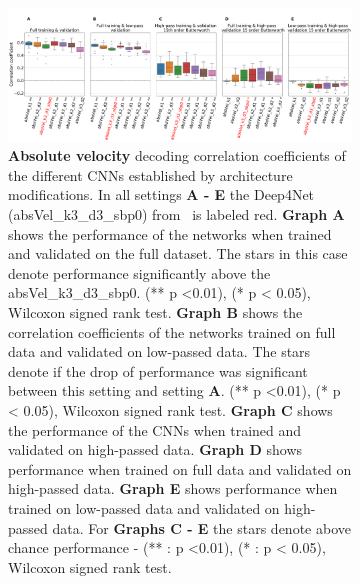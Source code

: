 \begin{itemize}
\begin{figure}
\begin{subfigure}[b]{\textwidth}
   \includegraphics[width=1\linewidth]{img/ch4/original_setting_absVel_performance_comparison}
   \caption{\textbf{Absolute velocity} decoding correlation coefficients of the different CNNs established by architecture modifications. In all settings \textbf{
   A - E} the Deep4Net (absVel\_k3\_d3\_sbp0) from~\cite{Hammer-2021} is labeled red. \textbf{Graph A} shows the performance of the networks when trained and validated on the full dataset. The stars in this case denote performance significantly above the absVel\_k3\_d3\_sbp0. (** p <0.01), (* p < 0.05), Wilcoxon signed rank test.
   \textbf{Graph B} shows the correlation coefficients of the networks trained on full data and validated on low-passed data. 
   The stars denote if the drop of performance was significant between this setting and setting \textbf{A}. (** p <0.01), (* p < 0.05), Wilcoxon signed rank test.
   \textbf{Graph C} shows the performance of the CNNs when trained and validated on high-passed data. \textbf{Graph D} shows performance when trained on full data and validated on high-passed data. \textbf{Graph E} shows performance when trained on low-passed data and validated on high-passed data. For \textbf{Graphs C - E} the stars denote above chance performance - (** : p <0.01), (* : p < 0.05), Wilcoxon signed rank test.}
   \label{fig:original-performances-absolute-velocity}
\end{subfigure}
\caption[Non-shifted causal prediction - performances ]{}
\label{fig:original-performances}
\end{figure}


\end{itemize}

